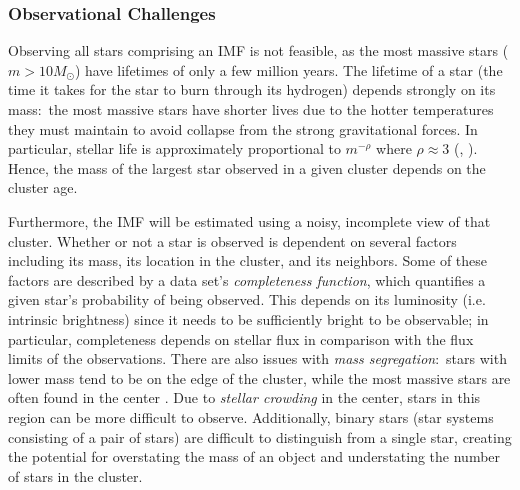 \documentclass[ejs]{imsart}
\numberwithin{equation}{section}
\theoremstyle{plain}
\newcommand{\Msun}{M_{\odot}}
\begin{document}
\subsubsection{Observational Challenges} \label{sec:observational}
Observing all stars comprising an IMF 
is not feasible, as the most massive stars ($m > 10 \Msun$) have lifetimes of 
only a few million years.
The lifetime of a star (the time it takes for the star to burn through its
hydrogen) depends strongly on its mass:~the most massive
stars have shorter lives due to the hotter temperatures they must maintain
to avoid collapse from the strong gravitational forces. In particular,
stellar life is 
approximately proportional to $m^{-\rho}$ 
where $\rho \approx 3$ (\citealt[p. 30]{hansen2004}, \citealt[p. 439]{Chaisson:2011}). 
Hence, the mass of the largest star observed in a given 
cluster depends on the cluster age.  %

Furthermore, the IMF will be estimated using a noisy, incomplete view of that cluster.  Whether or not a star is observed is dependent on several factors including its mass, its location in the cluster, and its neighbors.  Some of these factors are described by a data set's \emph{completeness function}, which quantifies a given star's probability of being observed.  This depends on its luminosity (i.e. intrinsic brightness) since it needs to be sufficiently bright to be observable; in particular, completeness depends on stellar flux in comparison with the flux limits of the observations.
There are also issues with {\it mass segregation}:~stars with lower mass tend to be on the edge of the cluster, while the most massive stars are often
found in the center \citep{weisz13}. Due to {\it stellar crowding} in the center, stars in this region can be more difficult to observe.  Additionally, binary stars (star systems consisting of a pair of stars) 
are difficult to distinguish from a single star, creating the potential for overstating the mass of an object and understating the number of stars in the cluster.
\end{document}
